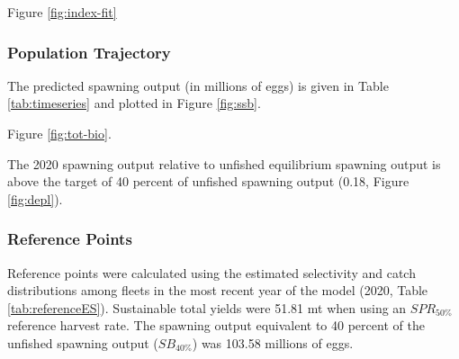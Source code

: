 \documentclass[11pt,
  english,
  a4paper,
]{article}
\begin{document}

Figure \ref{fig:index-fit}

\leavevmode\tagmcend\tagstructend\par


\hypertarget{population-trajectory}{%
\subsubsection{Population Trajectory}\label{population-trajectory}}

\leavevmode\tagmcend\tagstructend


The predicted spawning output (in millions of eggs) is given in Table \ref{tab:timeseries} and plotted in Figure \ref{fig:ssb}.

\leavevmode\tagmcend\tagstructend\par


Figure \ref{fig:tot-bio}.

\leavevmode\tagmcend\tagstructend\par


The 2020 spawning output relative to unfished equilibrium spawning output is above the target of 40 percent of unfished spawning output (0.18, Figure \ref{fig:depl}).

\leavevmode\tagmcend\tagstructend\par


\hypertarget{reference-points}{%
\subsubsection{Reference Points}\label{reference-points}}

\leavevmode\tagmcend\tagstructend


Reference points were calculated using the estimated selectivity and catch distributions among fleets in the most recent year of the model (2020, Table \ref{tab:referenceES}). Sustainable total yields were 51.81 mt when using an {\(SPR_{50\%}\)\leavevmode\tagmcend\tagstructend} reference harvest rate. The spawning output equivalent to 40 percent of the unfished spawning output ({\(SB_{40\%}\)\leavevmode\tagmcend\tagstructend}) was 103.58 millions of eggs.
\end{document}
